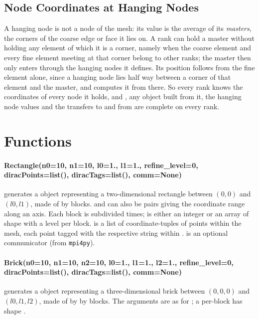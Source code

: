 \subsection{Node Coordinates at Hanging Nodes}\label{sec:oxley:mastercoords}
A hanging node is not a node of the \oxley mesh: its value is the average of
its \emph{masters}, the corners of the coarse edge or face it lies on. A rank
can hold a master without holding any element of which it is a corner, namely
when the coarse element and every fine element meeting at that corner belong
to other ranks; the master then only enters through the hanging nodes it
defines. Its position follows from the fine element alone, since a hanging
node lies half way between a corner of that element and the master, and
\oxley computes it from there. So every rank knows the coordinates of every
node it holds, and , any \Data object built from it, the hanging
node values and the transfers to and from \finley are complete on every rank.

\section{Functions}
\paragraph{Rectangle(n0=10, n1=10, l0=1., l1=1., refine_level=0,
diracPoints=list(), diracTags=list(), comm=None)}
generates a \Domain object representing a two-dimensional rectangle between
$(0,0)$ and $(l0,l1)$, made of  by  blocks.  and
 can also be pairs giving the coordinate range along an axis. Each
block is subdivided  times;  is either an
integer or an array of shape  with a level per block.
 is a list of coordinate-tuples of points within the mesh,
each point tagged with the respective string within .
 is an optional \MPI communicator (from \texttt{mpi4py}).

\paragraph{Brick(n0=10, n1=10, n2=10, l0=1., l1=1., l2=1., refine_level=0,
diracPoints=list(), diracTags=list(), comm=None)}
generates a \Domain object representing a three-dimensional brick between
$(0,0,0)$ and $(l0,l1,l2)$, made of  by  by  blocks.
The arguments are as for ; a per-block 
has shape .

